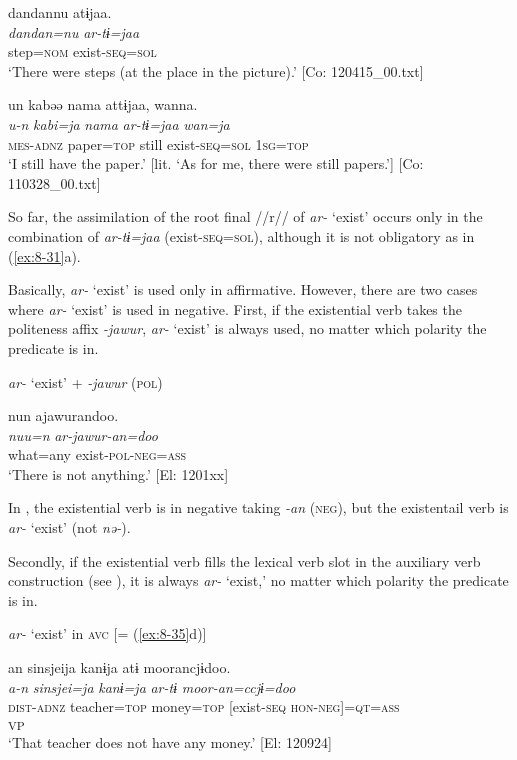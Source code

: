 \ea\label{ex:8-31}
\ea
{\TM}
\glll  dandannu  atɨjaa.\\
\textit{dandan=nu}  \textit{ar-tɨ=jaa}\\
step=\textsc{nom}  exist-\textsc{seq}=\textsc{sol}\\
\glt ‘There were steps (at the place in the picture).’ [Co: 120415\_00.txt]

\ex
{\TM}
\glll  un  kabəə  nama  attɨjaa,  wanna.\\
\textit{u-n}  \textit{kabi=ja}  \textit{nama}  \textit{ar-tɨ=jaa}  \textit{wan=ja}\\
\textsc{mes}-\textsc{adnz}  paper=\textsc{top}  still  exist-\textsc{seq}=\textsc{sol}  1\textsc{sg}=\textsc{top}\\
\glt ‘I still have the paper.’ [lit. ‘As for me, there were still papers.’]       [Co: 110328\_00.txt]
\z
\z

So far, the assimilation of the root final //r// of \textit{ar-} ‘exist’ occurs only in the combination of \textit{ar-tɨ=jaa} (exist-\textsc{seq}=\textsc{sol}), although it is not obligatory as in (\ref{ex:8-31}a).

  Basically, \textit{ar-} ‘exist’ is used only in affirmative. However, there are two cases where \textit{ar-} ‘exist’ is used in negative. First, if the existential verb takes the politeness affix \textit{-jawur}, \textit{ar-} ‘exist’ is always used, no matter which polarity the predicate is in.

\ea\label{ex:8-32}
  \textit{ar-} ‘exist’ + \textit{-jawur} (\textsc{pol})

  {\TM}
\glll  nun  ajawurandoo.\\
\textit{nuu=n}  \textit{ar-jawur-an=doo}\\
    what=any  exist-\textsc{pol}-\textsc{neg}=\textsc{ass}\\
\glt ‘There is not anything.’ [El: 1201xx]
\z

In , the existential verb is in negative taking \textit{-an} (\textsc{neg}), but the existentail verb is \textit{ar-} ‘exist’ (not \textit{nə-}).

  Secondly, if the existential verb fills the lexical verb slot in the auxiliary verb construction (see ), it is always \textit{ar-} ‘exist,’ no matter which polarity the predicate is in.

\ea\label{ex:8-33}
  \textit{ar-} ‘exist’ in \textsc{avc} [= (\ref{ex:8-35}d)]

  {\TM}
\glll  an  sinsjeija  kanɨja  atɨ  moorancjɨdoo.\\
\textit{a-n}  \textit{sinsjei=ja}  \textit{kanɨ=ja}  \textit{ar-tɨ}  \textit{moor-an=ccjɨ=doo}\\
    \textsc{dist}-\textsc{adnz}  teacher=\textsc{top}  money=\textsc{top}  [exist-\textsc{seq}  \textsc{hon}-\textsc{neg}]=\textsc{qt}=\textsc{ass}\\
          [Lex. verb  Aux. verb]\textsubscript{VP}\\
\glt ‘That teacher does not have any money.’ [El: 120924]
\z

